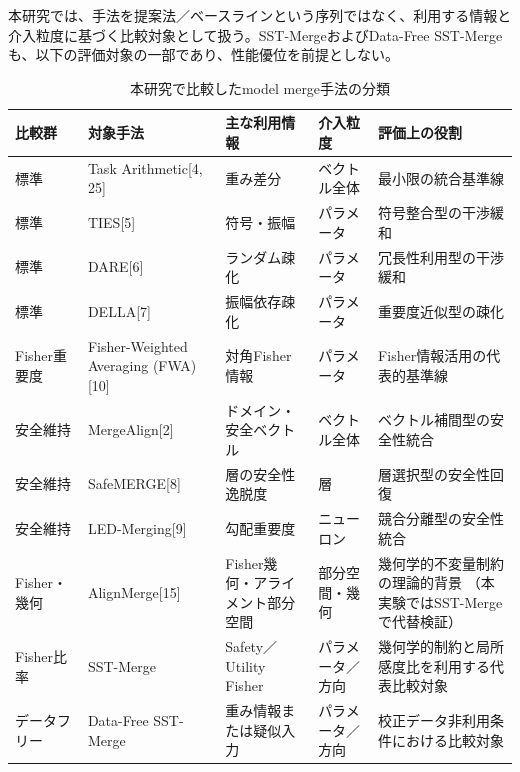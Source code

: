 \documentclass{article}
\begin{document}
本研究では、手法を提案法／ベースラインという序列ではなく、利用する情報と介入粒度に基づく比較対象として扱う。SST-MergeおよびData-Free SST-Mergeも、以下の評価対象の一部であり、性能優位を前提としない。
\begin{table}[H]
\centering
\caption{本研究で比較したmodel merge手法の分類}
\label{tab:baseline_methods}
\small
\begin{tabular}{p{1.8cm}p{2.6cm}p{2.8cm}p{2.3cm}p{4.3cm}}
\toprule
比較群 & 対象手法 & 主な利用情報 & 介入粒度 & 評価上の役割 \\
\midrule

標準 & Task Arithmetic[4, 25] & 重み差分 & ベクトル全体 & 最小限の統合基準線 \\

標準 & TIES[5] & 符号・振幅 & パラメータ & 符号整合型の干渉緩和 \\

標準 & DARE[6] & ランダム疎化 & パラメータ & 冗長性利用型の干渉緩和 \\

標準 & DELLA[7] & 振幅依存疎化 & パラメータ & 重要度近似型の疎化 \\

Fisher重要度 & Fisher-Weighted Averaging (FWA)[10] & 対角Fisher情報 & パラメータ & Fisher情報活用の代表的基準線 \\

安全維持 & MergeAlign[2] & ドメイン・安全ベクトル & ベクトル全体 & ベクトル補間型の安全性統合 \\

安全維持 & SafeMERGE[8] & 層の安全性逸脱度 & 層 & 層選択型の安全性回復 \\

安全維持 & LED-Merging[9] & 勾配重要度 & ニューロン & 競合分離型の安全性統合 \\

Fisher・幾何 & AlignMerge[15] & Fisher幾何・アライメント部分空間 & 部分空間・幾何 & 幾何学的不変量制約の理論的背景
（本実験ではSST-Mergeで代替検証） \\

Fisher比率 & SST-Merge & Safety／Utility Fisher & パラメータ／方向 & 幾何学的制約と局所感度比を利用する代表比較対象 \\

データフリー & Data-Free SST-Merge & 重み情報または疑似入力 & パラメータ／方向 & 校正データ非利用条件における比較対象 \\
\bottomrule
\end{tabular}
\end{table}
\end{document}
